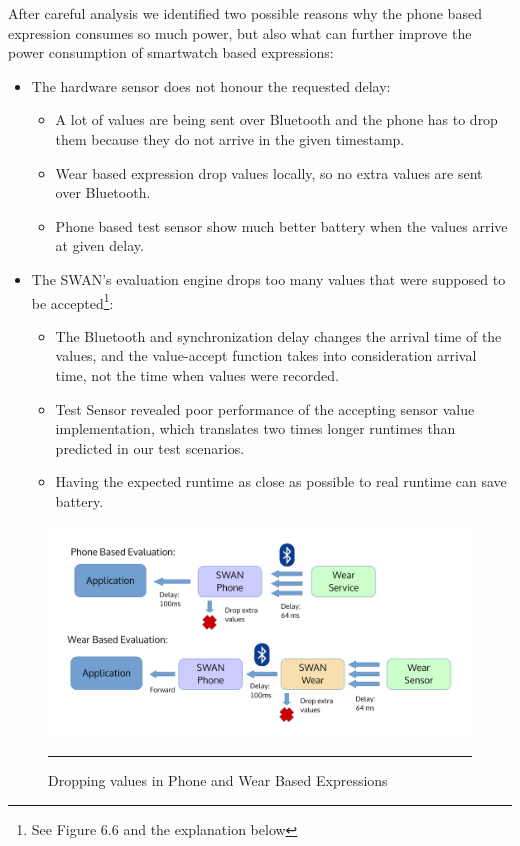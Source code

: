 After careful analysis we identified two possible reasons why the phone based expression consumes so much power, but also what can further improve the power consumption of smartwatch based expressions:
\begin{itemize}
 \item The hardware sensor does not honour the requested delay:
 \begin{itemize}
  \item A lot of values are being sent over Bluetooth and the phone has to drop them because they do not arrive in the given timestamp.
  \item Wear based expression drop values locally, so no extra values are sent over Bluetooth.
  \item Phone based test sensor show much better battery when the values arrive at given delay.
 \end{itemize}
 \item The SWAN's evaluation engine drops too many values that were supposed to be accepted\footnote{See Figure 6.6 and the explanation below}:
 \begin{itemize}
  \item The Bluetooth and synchronization delay changes the arrival time of the values, and the value-accept function takes into consideration arrival time, not the time when values were recorded.
  \item Test Sensor revealed poor performance of the accepting sensor value implementation, which translates two times longer runtimes than predicted in our test scenarios.
  \item Having the expected runtime as close as possible to real runtime can save battery.
 \end{itemize}
\end{itemize}

  \begin{figure}[htbp]
  \centering
    \includegraphics[scale=0.5]{Figures/swan_drop_val.pdf}
    \rule{35em}{0.5pt}
  \caption[Dropping values in Phone and Wear Based Expressions]{Dropping values in Phone and Wear Based Expressions}
  \label{fig:swan_drop_val}
\end{figure}

